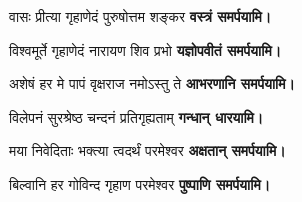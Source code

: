 \begin{center}
{वासः प्रीत्या गृहाणेदं पुरुषोत्तम शङ्कर}
\textbf{\devAya{} वस्त्रं समर्पयामि।}
\medskip

{विश्वमूर्ते गृहाणेदं नारायण शिव प्रभो}
\textbf{\devAya{} यज्ञोपवीतं समर्पयामि।}
\medskip

{अशेषं हर मे पापं वृक्षराज नमोऽस्तु ते}
\textbf{\devAya{} आभरणानि समर्पयामि।}
\medskip

{विलेपनं सुरश्रेष्ठ चन्दनं प्रतिगृह्यताम्}
\textbf{\devAya{} गन्धान् धारयामि।}
\medskip

{मया निवेदिताः भक्त्या त्वदर्थं परमेश्वर}
\textbf{\devAya{} अक्षतान् समर्पयामि।}
\medskip

{बिल्वानि हर गोविन्द गृहाण परमेश्वर}
\textbf{\devAya{} पुष्पाणि समर्पयामि।}

\end{center}

